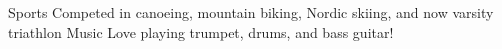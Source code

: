 
\begin{cvskills}
  \cvskill
    {Sports} %
    {Competed in canoeing, mountain biking, Nordic skiing, and now varsity triathlon}
  \cvskill
    {Music} %
    {Love playing trumpet, drums, and bass guitar!}
\end{cvskills}
